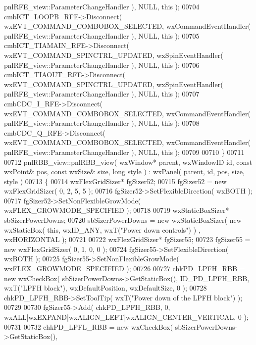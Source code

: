 \begin{DoxyCode}
      pnlRFE_view::ParameterChangeHandler ), NULL, \textcolor{keyword}{this} );
00704     cmbICT_LOOPB_RFE->Disconnect( wxEVT\_COMMAND\_COMBOBOX\_SELECTED, wxCommandEventHandler( 
      pnlRFE_view::ParameterChangeHandler ), NULL, \textcolor{keyword}{this} );
00705     cmbICT_TIAMAIN_RFE->Disconnect( wxEVT\_COMMAND\_SPINCTRL\_UPDATED, wxSpinEventHandler( 
      pnlRFE_view::ParameterChangeHandler ), NULL, \textcolor{keyword}{this} );
00706     cmbICT_TIAOUT_RFE->Disconnect( wxEVT\_COMMAND\_SPINCTRL\_UPDATED, wxSpinEventHandler( 
      pnlRFE_view::ParameterChangeHandler ), NULL, \textcolor{keyword}{this} );
00707     cmbCDC_I_RFE->Disconnect( wxEVT\_COMMAND\_COMBOBOX\_SELECTED, wxCommandEventHandler( 
      pnlRFE_view::ParameterChangeHandler ), NULL, \textcolor{keyword}{this} );
00708     cmbCDC_Q_RFE->Disconnect( wxEVT\_COMMAND\_COMBOBOX\_SELECTED, wxCommandEventHandler( 
      pnlRFE_view::ParameterChangeHandler ), NULL, \textcolor{keyword}{this} );
00709     
00710 \}
00711 
00712 pnlRBB_view::pnlRBB_view( wxWindow* parent, wxWindowID \textcolor{keywordtype}{id}, \textcolor{keyword}{const} wxPoint& pos, \textcolor{keyword}{const} wxSize& 
      size, \textcolor{keywordtype}{long} style ) : wxPanel( parent, id, pos, size, style )
00713 \{
00714     wxFlexGridSizer* fgSizer52;
00715     fgSizer52 = \textcolor{keyword}{new} wxFlexGridSizer( 0, 2, 5, 5 );
00716     fgSizer52->SetFlexibleDirection( wxBOTH );
00717     fgSizer52->SetNonFlexibleGrowMode( wxFLEX\_GROWMODE\_SPECIFIED );
00718     
00719     wxStaticBoxSizer* sbSizerPowerDowns;
00720     sbSizerPowerDowns = \textcolor{keyword}{new} wxStaticBoxSizer( \textcolor{keyword}{new} wxStaticBox( \textcolor{keyword}{this}, wxID\_ANY, wxT(\textcolor{stringliteral}{"Power down controls"}) )
      , wxHORIZONTAL );
00721     
00722     wxFlexGridSizer* fgSizer55;
00723     fgSizer55 = \textcolor{keyword}{new} wxFlexGridSizer( 0, 1, 0, 0 );
00724     fgSizer55->SetFlexibleDirection( wxBOTH );
00725     fgSizer55->SetNonFlexibleGrowMode( wxFLEX\_GROWMODE\_SPECIFIED );
00726     
00727     chkPD_LPFH_RBB = \textcolor{keyword}{new} wxCheckBox( sbSizerPowerDowns->GetStaticBox(), 
      ID_PD_LPFH_RBB, wxT(\textcolor{stringliteral}{"LPFH block"}), wxDefaultPosition, wxDefaultSize, 0 );
00728     chkPD_LPFH_RBB->SetToolTip( wxT(\textcolor{stringliteral}{"Power down of the LPFH block"}) );
00729     
00730     fgSizer55->Add( chkPD_LPFH_RBB, 0, wxALL|wxEXPAND|wxALIGN\_LEFT|wxALIGN\_CENTER\_VERTICAL, 0 );
00731     
00732     chkPD_LPFL_RBB = \textcolor{keyword}{new} wxCheckBox( sbSizerPowerDowns->GetStaticBox(), 

\end{DoxyCode}
